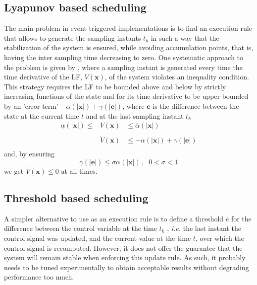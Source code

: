 \documentclass{article}
\begin{document}
		\subsection{Lyapunov based scheduling}
			The main problem in event-triggered implementations is to find an execution rule that allows to generate the sampling instants $t_k$ in such a way that the stabilization of the system is ensured, while avoiding accumulation points, that is, having the inter sampling time decreasing to zero. One systematic approach to the problem is given by \cite{tabuada_event_control}, where a sampling instant is generated every time the time derivative of the LF, $V(\mathbf{x})$, of the system violates an inequality condition. This strategy requires the LF to be bounded above and below by strictly increasing functions of the state and for its time derivative to be upper bounded by an 'error term' $-\alpha(|\mathbf{x}|) + \gamma(|\mathbf{e}|)$, where $\mathbf{e}$ is the difference between the state at the current time $t$ and at the last sampling instant $t_k$
			\begin{equation}
				\begin{array}{lll}
					\underline \alpha(|\mathbf{x}|) \leq & V(\mathbf{x}) & \leq \overline \alpha(|\mathbf{x}|) \\\\
					\, &\dot V(\mathbf{x}) &\leq -\alpha(|\mathbf{x}|) + \gamma(|\mathbf{e}|) \\
				\end{array}
				\label{event}
			\end{equation}
			and, by ensuring 
			\begin{equation}
				\gamma(|\mathbf{e}|) \leq \sigma \alpha(|\mathbf{x}|)\, , \;\; 0 < \sigma < 1
				\label{up_rule}
			\end{equation}
			we get $\dot V(\mathbf{x}) \leq 0$ at all times.
		
		\subsection{Threshold based scheduling}
			A simpler alternative to use as an execution rule is to define a threshold $\overline e$ for the difference between the control variable at the time $t_k$ \cite{lehmann}, \emph{i.e.} the last instant the control signal was updated, and the current value at the time $t$, over which the control signal is recomputed. However, it does not offer the guarantee that the system will remain stable when enforcing this update rule. As such, it probably needs to be tuned experimentally to obtain acceptable results without degrading performance too much.
			
\end{document}
